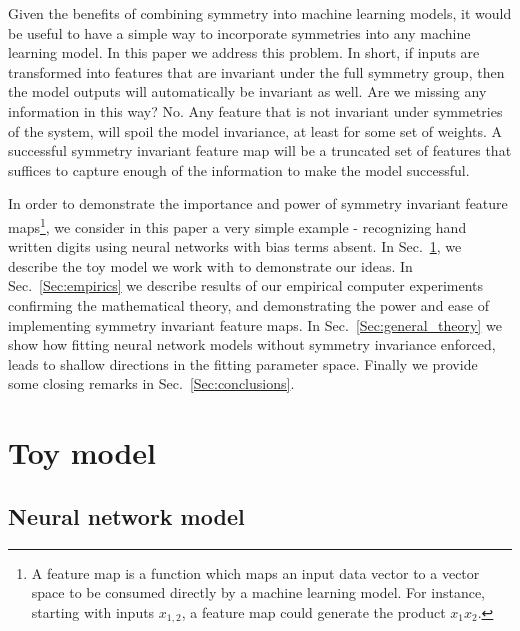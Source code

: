 \documentclass{svproc}
\begin{document}
Given the benefits of combining symmetry into machine learning models, it would be useful to have a simple way to incorporate symmetries into any machine learning model. In this paper we address this problem. In short, if inputs are transformed into features that are invariant under the full symmetry group, then the model outputs will automatically be invariant as well. Are we missing any information in this way? No. Any feature that is not invariant under symmetries of the system, will spoil the model invariance, at least for some set of weights. A successful symmetry invariant feature map will be a truncated set of features that suffices to capture enough of the information to make the model successful.

In order to demonstrate the importance and power of symmetry invariant feature maps\footnote{A feature map is a function which maps an input data vector to a vector space to be consumed directly by a machine learning model. For instance, starting with inputs $x_{1,2}$, a feature map could generate the product $x_1 x_2$.}, we consider in this paper a very simple example - recognizing hand written digits using neural networks with bias terms absent. In Sec.~\ref{Sec:model}, we describe the toy model we work with to demonstrate our ideas. In Sec.~\ref{Sec:empirics} we describe results of our empirical computer experiments confirming the mathematical theory, and demonstrating the power and ease of implementing symmetry invariant feature maps. In Sec.~\ref{Sec:general_theory} we show how fitting neural network models without symmetry invariance enforced, leads to shallow directions in the fitting parameter space. Finally we provide some closing remarks in Sec.~\ref{Sec:conclusions}.





\section{Toy model}\label{Sec:model}
\subsection{Neural network model}\label{Sec:dumb_NN}
\end{document}
